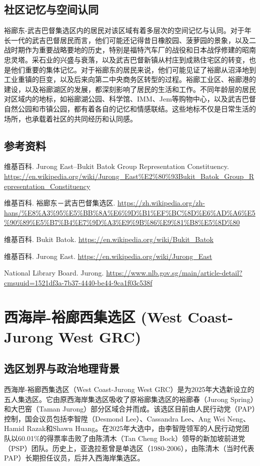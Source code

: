 \documentclass[11pt,a4paper,twoside,openany]{book}
\begin{document}
\section{社区记忆与空间认同}
裕廊东-武吉巴督集选区内的居民对该区域有着多层次的空间记忆与认同。对于年长一代的武吉巴督居民而言，他们可能还记得昔日橡胶园、菠萝园的景象，以及二战时期作为重要战略要地的历史，特别是福特汽车厂的战役和日本战俘修建的昭南忠灵塔。采石业的兴盛与衰落，以及武吉巴督新镇从村庄到成熟住宅区的转变，也是他们重要的集体记忆。对于裕廊东的居民来说，他们可能见证了裕廊从沼泽地到工业重镇的巨变，以及后来向第二中央商务区转型的过程。裕廊工业区、裕廊港的建设，以及裕廊湖区的发展，都深刻影响了居民的生活和工作。不同年龄层的居民对区域内的地标，如裕廊湖公园、科学馆、IMM、Jem等购物中心，以及武吉巴督自然公园和市镇公园，都有着各自的记忆和情感联结。这些地标不仅是日常生活的场所，也承载着社区的共同经历和认同感。

\section*{参考资料}
\begin{enumerate}[label={[\arabic*]},leftmargin=*,topsep=2pt,itemsep=1pt,parsep=0pt]
  \item 维基百科. Jurong East–Bukit Batok Group Representation Constituency. \url{https://en.wikipedia.org/wiki/Jurong_East%E2%80%93Bukit_Batok_Group_Representation_Constituency}
  \item 维基百科. 裕廊东－武吉巴督集选区. \url{https://zh.wikipedia.org/zh-hans/%E8%A3%95%E5%BB%8A%E6%9D%B1%EF%BC%8D%E6%AD%A6%E5%90%89%E5%B7%B4%E7%9D%A3%E9%9B%86%E9%81%B8%E5%8D%80}
  \item 维基百科. Bukit Batok. \url{https://en.wikipedia.org/wiki/Bukit_Batok}
  \item 维基百科. Jurong East. \url{https://en.wikipedia.org/wiki/Jurong_East}
  \item National Library Board. Jurong. \url{https://www.nlb.gov.sg/main/article-detail?cmsuuid=1521df3a-7b37-4440-be44-9ca1f03c538f}
\end{enumerate}

\chapter{西海岸-裕廊西集选区 (West Coast-Jurong West GRC)}

\section{选区划界与政治地理背景}
西海岸-裕廊西集选区（West Coast-Jurong West GRC）是为2025年大选新设立的五人集选区。它由原西海岸集选区吸收了原裕廊集选区的裕廊春（Jurong Spring）和大巴窑（Taman Jurong）部分区域合并而成。该选区目前由人民行动党（PAP）控制，国会议员包括李智陞（Desmond Lee）、Cassandra Lee、Ang Wei Neng、Hamid Razak和Shawn Huang。在2025年大选中，由李智陞领军的人民行动党团队以60.01\%的得票率击败了由陈清木（Tan Cheng Bock）领导的新加坡前进党（PSP）团队。历史上，亚逸拉惹曾是单选区（1980-2006），由陈清木（当时代表PAP）长期担任议员，后并入西海岸集选区。
\end{document}
